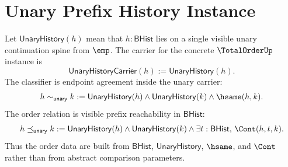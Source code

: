 \section{Unary Prefix History Instance}
\label{sec:totalorder-unary-prefix-history-instance}

\begin{definition}
\label{def:totalorder-unary-prefix-bhist-instance}
Let $\mathsf{UnaryHistory}(h)$ mean that $h:\mathsf{BHist}$ lies on a single
visible unary continuation spine from $\emp$. The carrier for the concrete
$\TotalOrderUp$ instance is
$$
\mathsf{UnaryHistoryCarrier}(h):=\mathsf{UnaryHistory}(h).
$$
The classifier is endpoint agreement inside the unary carrier:
$$
h\sim_{\mathsf{unary}}k:=
\mathsf{UnaryHistory}(h)\land\mathsf{UnaryHistory}(k)\land\hsame(h,k).
$$
The order relation is visible prefix reachability in $\mathsf{BHist}$:
$$
h\preceq_{\mathsf{unary}}k:=
\mathsf{UnaryHistory}(h)\land\mathsf{UnaryHistory}(k)\land
\exists t:\mathsf{BHist},\,\Cont(h,t,k).
$$
Thus the order data are built from $\mathsf{BHist}$, $\mathsf{UnaryHistory}$,
$\hsame$, and $\Cont$ rather than from abstract comparison parameters.
\end{definition}

